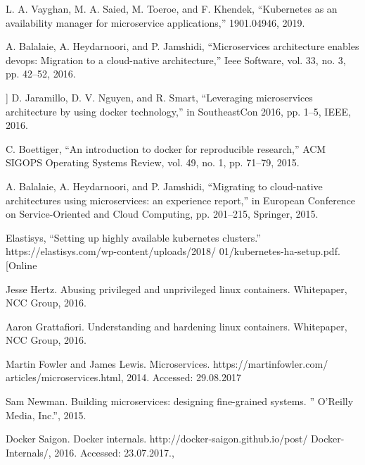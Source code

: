\documentclass[thesis=M,czech]{FITthesis}[2019/12/23]
\theoremstyle{plain}
\theoremstyle{definition}
\begin{document}
\begin{thebibliography}{9}
L. A. Vayghan, M. A. Saied, M. Toeroe, and F. Khendek, “Kubernetes as an availability manager for microservice applications,” 1901.04946, 2019.


A. Balalaie, A. Heydarnoori, and P. Jamshidi, “Microservices architecture enables devops: Migration to a cloud-native architecture,” Ieee Software, vol. 33, no. 3, pp. 42–52, 2016.



] D. Jaramillo, D. V. Nguyen, and R. Smart, “Leveraging microservices architecture by using docker technology,” in SoutheastCon 2016, pp. 1–5, IEEE,
2016.


C. Boettiger, “An introduction to docker for reproducible research,” ACM
SIGOPS Operating Systems Review, vol. 49, no. 1, pp. 71–79, 2015.


	A. Balalaie, A. Heydarnoori, and P. Jamshidi, “Migrating to cloud-native
architectures using microservices: an experience report,” in European Conference on Service-Oriented and Cloud Computing, pp. 201–215, Springer,
2015.



Elastisys, “Setting up highly available kubernetes clusters.”
https://elastisys.com/wp-content/uploads/2018/
01/kubernetes-ha-setup.pdf. [Online



	Jesse Hertz. Abusing privileged and unprivileged linux containers. Whitepaper,
	NCC Group, 2016.


	Aaron Grattafiori. Understanding and hardening linux containers. Whitepaper,
NCC Group, 2016.


Martin Fowler and James Lewis. Microservices. https://martinfowler.com/
articles/microservices.html, 2014. Accessed: 29.08.2017


Sam Newman. Building microservices: designing fine-grained systems. ” O’Reilly
Media, Inc.”, 2015.


Docker Saigon. Docker internals. http://docker-saigon.github.io/post/
Docker-Internals/, 2016. Accessed: 23.07.2017., 


\end{thebibliography}
\end{document}
